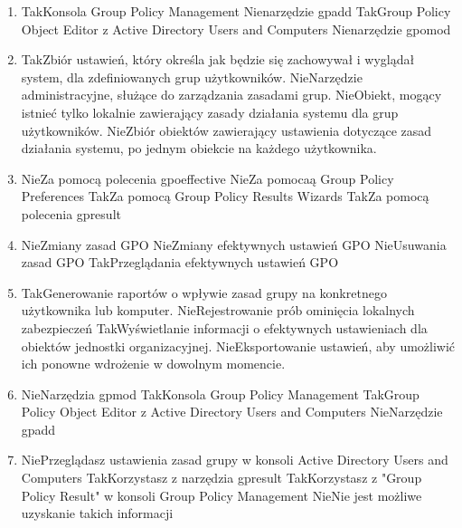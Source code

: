 \begin{enumerate}
		\item {}%
		{Tak}{Konsola Group Policy Management}%
		{Nie}{narzędzie gpadd}%
		{Tak}{Group Policy Object Editor z Active Directory Users and Computers}%
		{Nie}{narzędzie gpomod}
		
		\item {}%
		{Tak}{Zbiór ustawień, który określa jak będzie się zachowywał i wyglądał system, dla zdefiniowanych grup użytkowników.}%
		{Nie}{Narzędzie administracyjne, służące do zarządzania zasadami grup.}%
		{Nie}{Obiekt, mogący istnieć tylko lokalnie zawierający zasady działania systemu dla grup użytkowników.}%
		{Nie}{Zbiór obiektów zawierający ustawienia dotyczące zasad działania systemu, po jednym obiekcie na każdego użytkownika.}
		
		\item {}%
		{Nie}{Za pomocą polecenia gpoeffective}%
		{Nie}{Za pomocaą Group Policy Preferences}%
		{Tak}{Za pomocą Group Policy Results Wizards}%
		{Tak}{Za pomocą polecenia gpresult}
		
		\item {}%
		{Nie}{Zmiany zasad GPO}%
		{Nie}{Zmiany efektywnych ustawień GPO}%
		{Nie}{Usuwania zasad GPO}%
		{Tak}{Przeglądania efektywnych ustawień GPO}
		
		\item {}%
		{Tak}{Generowanie raportów o wpływie zasad grupy na konkretnego użytkownika lub komputer.}%
		{Nie}{Rejestrowanie prób ominięcia lokalnych zabezpieczeń}%
		{Tak}{Wyświetlanie informacji o efektywnych ustawieniach dla obiektów jednostki organizacyjnej.}%
		{Nie}{Eksportowanie ustawień, aby umożliwić ich ponowne wdrożenie w dowolnym momencie.}
		
		\item {}%
		{Nie}{Narzędzia gpmod}%
		{Tak}{Konsola Group Policy Management}%
		{Tak}{Group Policy Object Editor z Active Directory Users and Computers}%
		{Nie}{Narzędzie gpadd}
		
		\item {}%
		{Nie}{Przeglądasz ustawienia zasad grupy w konsoli Active Directory Users and Computers}%
		{Tak}{Korzystasz z narzędzia gpresult}%
		{Tak}{Korzystasz z  "Group Policy Result" w konsoli Group Policy Management}%
		{Nie}{Nie jest możliwe uzyskanie takich informacji}
		

\end{enumerate}
